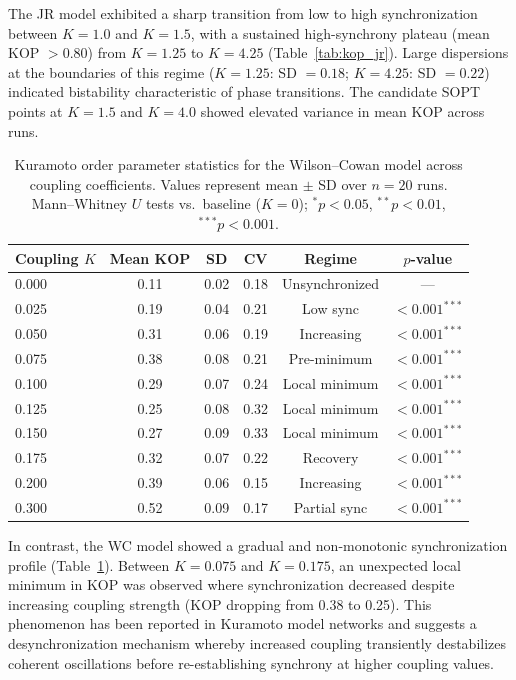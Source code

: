 \documentclass[11pt]{article}
\begin{document}
The JR model exhibited a sharp transition from low to high synchronization between $K = 1.0$ and $K = 1.5$, with a sustained high-synchrony plateau (mean KOP $> 0.80$) from $K = 1.25$ to $K = 4.25$ (Table~\ref{tab:kop_jr}). Large dispersions at the boundaries of this regime ($K = 1.25$: SD $= 0.18$; $K = 4.25$: SD $= 0.22$) indicated bistability characteristic of phase transitions. The candidate SOPT points at $K = 1.5$ and $K = 4.0$ showed elevated variance in mean KOP across runs.

\begin{table}[H]
\centering
\caption{Kuramoto order parameter statistics for the Wilson--Cowan model across coupling coefficients. Values represent mean $\pm$ SD over $n = 20$ runs. Mann--Whitney $U$ tests vs.\ baseline ($K = 0$); $^{*}p < 0.05$, $^{**}p < 0.01$, $^{***}p < 0.001$.}
\label{tab:kop_wc}
\begin{tabular}{lccccc}
\toprule
Coupling $K$ & Mean KOP & SD & CV & Regime & $p$-value \\
\midrule
0.000 & 0.11 & 0.02 & 0.18 & Unsynchronized & --- \\
0.025 & 0.19 & 0.04 & 0.21 & Low sync & $< 0.001^{***}$ \\
0.050 & 0.31 & 0.06 & 0.19 & Increasing & $< 0.001^{***}$ \\
0.075 & 0.38 & 0.08 & 0.21 & Pre-minimum & $< 0.001^{***}$ \\
0.100 & 0.29 & 0.07 & 0.24 & Local minimum & $< 0.001^{***}$ \\
0.125 & 0.25 & 0.08 & 0.32 & Local minimum & $< 0.001^{***}$ \\
0.150 & 0.27 & 0.09 & 0.33 & Local minimum & $< 0.001^{***}$ \\
0.175 & 0.32 & 0.07 & 0.22 & Recovery & $< 0.001^{***}$ \\
0.200 & 0.39 & 0.06 & 0.15 & Increasing & $< 0.001^{***}$ \\
0.300 & 0.52 & 0.09 & 0.17 & Partial sync & $< 0.001^{***}$ \\
\bottomrule
\end{tabular}
\end{table}

In contrast, the WC model showed a gradual and non-monotonic synchronization profile (Table~\ref{tab:kop_wc}). Between $K = 0.075$ and $K = 0.175$, an unexpected local minimum in KOP was observed where synchronization decreased despite increasing coupling strength (KOP dropping from 0.38 to 0.25). This phenomenon has been reported in Kuramoto model networks \citep{acebrón2005kuramoto} and suggests a desynchronization mechanism whereby increased coupling transiently destabilizes coherent oscillations before re-establishing synchrony at higher coupling values.
\end{document}
